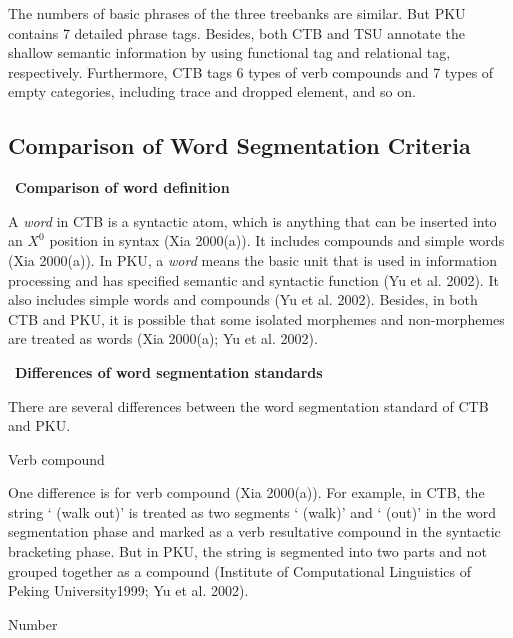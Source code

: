 \documentclass[english]{jnlp_1.4}
\renewcommand{\subsubsection}{}
\begin{document}
The numbers of basic phrases of the three treebanks are similar. But PKU 
contains 7 detailed phrase tags. Besides, both CTB and TSU annotate the 
shallow semantic information by using functional tag and relational tag, 
respectively. Furthermore, CTB tags 6 types of verb compounds and 7 types of 
empty categories, including trace and dropped element, and so on. 



\subsection{Comparison of Word Segmentation Criteria}

\noindent
\textbullet\ \textbf{Comparison of word definition}

A \textit{word} in CTB is a syntactic atom, which is anything that can be inserted into 
an $X^{0}$ position in syntax (Xia 2000(a)). It includes compounds and simple 
words (Xia 2000(a)). In PKU, a \textit{word} means the basic unit that is used in 
information processing and has specified semantic and syntactic function (Yu 
et al. 2002). It also includes simple words and compounds (Yu et al. 2002). 
Besides, in both CTB and PKU, it is possible that some isolated morphemes 
and non-morphemes are treated as words (Xia 2000(a); Yu et al. 2002). 

\noindent
\textbullet\ \textbf{Differences of word segmentation standards}

There are several differences between the word segmentation standard of CTB 
and PKU.


\subsubsection{Verb compound}

One difference is for verb compound (Xia 2000(a)). For example, in CTB, the 
string ` (walk out)' is treated as two 
segments ` (walk)' and ` (out)' in the word 
segmentation phase and marked as a verb resultative compound in the 
syntactic bracketing phase. But in PKU, the string is segmented into two 
parts and not grouped together as a compound (Institute of Computational 
Linguistics of Peking University1999; Yu et al. 2002).

\subsubsection{Number}
\end{document}
